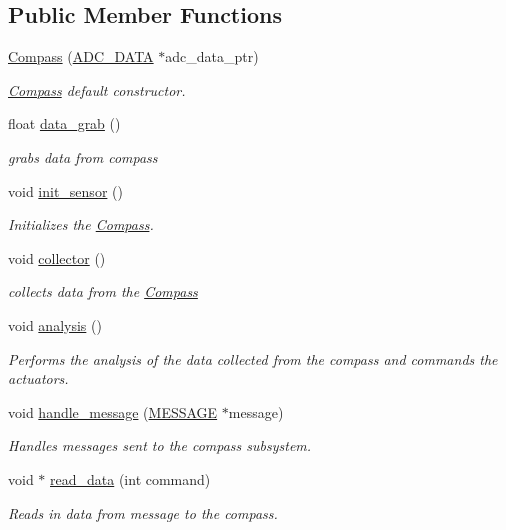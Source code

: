 \subsection*{Public Member Functions}
\begin{DoxyCompactItemize}
\item 
\hyperlink{classCompass_ab4210309aac39913ac3b20a0fef51df0}{Compass} (\hyperlink{SUBSYS__COMMANDS_8h_a0be7f6e3de248ca3bdb1f3f5a0819c62}{A\-D\-C\-\_\-\-D\-A\-T\-A} $\ast$adc\-\_\-data\-\_\-ptr)
\begin{DoxyCompactList}\small\item\em \hyperlink{classCompass}{Compass} default constructor. \end{DoxyCompactList}\item 
float \hyperlink{classCompass_aa4132c05a4e20e95633c72776385bc42}{data\-\_\-grab} ()
\begin{DoxyCompactList}\small\item\em grabs data from compass \end{DoxyCompactList}\item 
void \hyperlink{classCompass_a5cc2b71700af542b5aafadea4820a476}{init\-\_\-sensor} ()
\begin{DoxyCompactList}\small\item\em Initializes the \hyperlink{classCompass}{Compass}. \end{DoxyCompactList}\item 
void \hyperlink{classCompass_ae8d7f3417a27b1d18487b96ca07dd32b}{collector} ()
\begin{DoxyCompactList}\small\item\em collects data from the \hyperlink{classCompass}{Compass} \end{DoxyCompactList}\item 
void \hyperlink{classCompass_a4dd6402d0ece9203c6b92670265b4c8d}{analysis} ()
\begin{DoxyCompactList}\small\item\em Performs the analysis of the data collected from the compass and commands the actuators. \end{DoxyCompactList}\item 
void \hyperlink{classCompass_a1fb0f64b335e8f1d4f27dc2067312b4a}{handle\-\_\-message} (\hyperlink{SUBSYS__COMMANDS_8h_ad814416fc1a8c675bea2687d96088a8f}{M\-E\-S\-S\-A\-G\-E} $\ast$message)
\begin{DoxyCompactList}\small\item\em Handles messages sent to the compass subsystem. \end{DoxyCompactList}\item 
void $\ast$ \hyperlink{classCompass_ab55d084e2d643df0a1970f5868d0c5a8}{read\-\_\-data} (int command)
\begin{DoxyCompactList}\small\item\em Reads in data from message to the compass. \end{DoxyCompactList}\end{DoxyCompactItemize}
